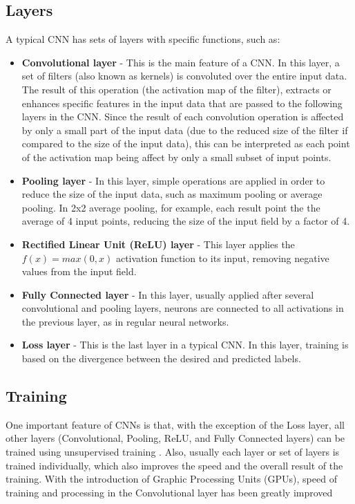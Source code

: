 \subsection{Layers}
\label{sec:convolution:convolutionalneuralnetworks:layers}
A typical CNN has sets of layers with specific functions, such as:
\begin{itemize}
    \item \textbf{Convolutional layer} - This is the main feature of a CNN.\newline
    In this layer, a set of filters (also known as kernels) is convoluted over the entire input data. The result of this operation (the activation map of the filter), extracts or enhances specific features in the input data that are passed to the following layers in the CNN.\newline
    Since the result of each convolution operation is affected by only a small part of the input data (due to the reduced size of the filter if compared to the size of the input data), this can be interpreted as each point of the activation map being affect by only a small subset of input points.
    \item \textbf{Pooling layer} - In this layer, simple operations are applied in order to reduce the size of the input data, such as maximum pooling or average pooling.\newline
    In 2x2 average pooling, for example, each result point the the average of 4 input points, reducing the size of the input field by a factor of 4.
    \item \textbf{Rectified Linear Unit (ReLU) layer} - This layer applies the $f(x) = max(0,x)$ activation function to its input, removing negative values from the input field.
    \item \textbf{Fully Connected layer} - In this layer, usually applied after several convolutional and pooling layers, neurons are connected to all activations in the previous layer, as in regular neural networks.
    \item \textbf{Loss layer} - This is the last layer in a typical CNN. In this layer, training is based on the divergence between the desired and predicted labels.
\end{itemize}
\subsection{Training}
\label{sec:convolution:convolutionalneuralnetworks:training}
One important feature of CNNs is that, with the exception of the Loss layer, all other layers (Convolutional, Pooling, ReLU, and Fully Connected layers) can be trained using unsupervised training \cite{Arel2010}.\newline
Also, usually each layer or set of layers is trained individually, which also improves the speed and the overall result of the training.\newline
With the introduction of Graphic Processing Units (GPUs), speed of training and processing in the Convolutional layer has been greatly improved \cite{Steinkrau2005}

